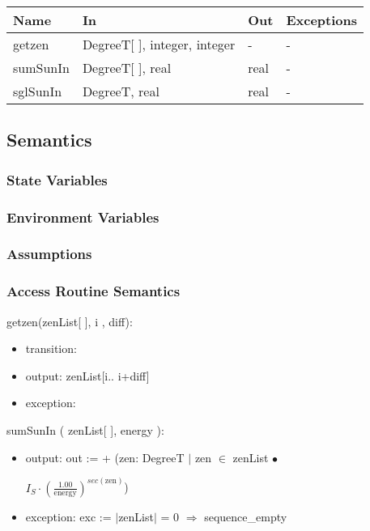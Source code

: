 \documentclass[12pt, titlepage]{article}
\begin{document}
\begin{center}
\begin{tabular}{p{2cm} p{4cm} p{4cm} p{2cm}}
\hline
\textbf{Name} & \textbf{In} & \textbf{Out} & \textbf{Exceptions} \\
\hline
getzen & DegreeT[ ], integer, integer & - & - \\
sumSunIn & DegreeT[ ], real & real & - \\
sglSunIn & DegreeT, real & real & - \\

\hline
\end{tabular}
\end{center}

\subsection{Semantics}

\subsubsection{State Variables}


\subsubsection{Environment Variables}


\subsubsection{Assumptions}


\subsubsection{Access Routine Semantics}

\noindent getzen(zenList[ ], i , diff):
\begin{itemize}
\item transition: 
\item output: zenList[i.. i+diff]
\item exception: 
\end{itemize}

\noindent sumSunIn (  zenList[ ], energy ):
\begin{itemize}
\item output: out := + (zen: DegreeT $|$ zen $\in$ zenList $\bullet$ 
\begin{center}\large
$I_{S} \cdot (\frac{1.00}{\text{energy}})^{sec(\text{zen})} $)
\end{center}
\item exception: exc := $|$zenList$|$ = 0 $\Rightarrow$ sequence\_empty
\end{itemize}
\end{document}
